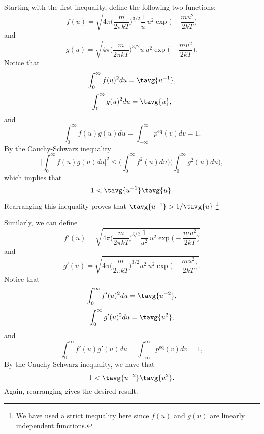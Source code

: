 Starting with the first inequality, define the following two functions:
\begin{equation}
f(u) = \sqrt{4\pi \bigg( \frac{m}{2\pi k T}\bigg)^{3/2} \frac{1}{u}~u^2 \exp\bigg(-\frac{m u^2}{2 k T}\bigg) } \nonumber
\end{equation}
and
\begin{equation}
g(u) = \sqrt{4\pi \bigg( \frac{m}{2\pi k T}\bigg)^{3/2} u ~u^2 \exp\bigg(-\frac{m u^2}{2 k T}\bigg) }. \nonumber
\end{equation}
Notice that
\begin{equation}
\int_{0}^{\infty} f(u)^2 du = \tavg{u^{-1}}, \nonumber
\end{equation}
\begin{equation}
\int_{0}^{\infty} g(u)^2 du  = \tavg{u}, \nonumber
\end{equation}
and
\begin{equation}
\int_{0}^{\infty} f(u)g (u)du  = \int_{-\infty}^{\infty} p^{\text{eq}}(v) dv = 1. \nonumber
\end{equation}
By the Cauchy-Schwarz inequality
\begin{equation}
\bigg|\int_{0}^{\infty} f(u) g(u) du \bigg|^2 \leq \bigg(\int_{0}^{\infty} f^2(u) du \bigg) \bigg(\int_{0}^{\infty} g^2(u) du \bigg),
\end{equation}
which implies that
\begin{equation}
1 < \tavg{u^{-1}} \tavg{u}.
\end{equation}
Rearranging this inequality proves that $\tavg{u^{-1}} > 1/\tavg{u}$ \footnote{We have used a strict inequality here since $f(u)$ and $g(u)$ are linearly independent functions.}

Similarly, we can define 
\begin{equation}
f'(u) = \sqrt{4\pi \bigg( \frac{m}{2\pi k T}\bigg)^{3/2} \frac{1}{u^2}~u^2 \exp\bigg(-\frac{m u^2}{2 k T}\bigg) }
\end{equation}
and
\begin{equation}
g'(u) = \sqrt{4\pi \bigg( \frac{m}{2\pi k T}\bigg)^{3/2} u^2 ~u^2 \exp\bigg(-\frac{m u^2}{2 k T}\bigg) }.
\end{equation}
Notice that
\begin{equation}
\int_{0}^{\infty} f'(u)^2 du = \tavg{u^{-2}},
\end{equation}
\begin{equation}
\int_{0}^{\infty} g'(u)^2 du  = \tavg{u^2},
\end{equation}
and
\begin{equation}
\int_{0}^{\infty} f'(u)g'(u)du  = \int_{-\infty}^{\infty} p^{\text{eq}}(v) dv = 1,
\end{equation}
By the Cauchy-Schwarz inequality, we have that
\begin{equation}
1 < \tavg{u^{-2}} \tavg{u^2}.
\end{equation}
Again, rearranging gives the desired result.